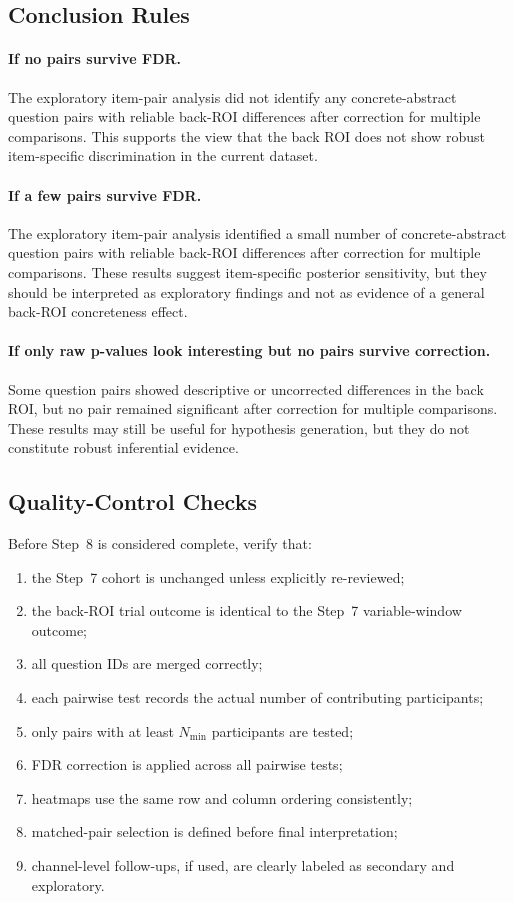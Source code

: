 \subsection{Conclusion Rules}

\paragraph{If no pairs survive FDR.}
The exploratory item-pair analysis did not identify any concrete-abstract question pairs with
reliable back-ROI differences after correction for multiple comparisons.
This supports the view that the back ROI does not show robust item-specific discrimination
in the current dataset.

\paragraph{If a few pairs survive FDR.}
The exploratory item-pair analysis identified a small number of concrete-abstract question pairs
with reliable back-ROI differences after correction for multiple comparisons.
These results suggest item-specific posterior sensitivity, but they should be interpreted as
exploratory findings and not as evidence of a general back-ROI concreteness effect.

\paragraph{If only raw p-values look interesting but no pairs survive correction.}
Some question pairs showed descriptive or uncorrected differences in the back ROI, but no pair
remained significant after correction for multiple comparisons.
These results may still be useful for hypothesis generation, but they do not constitute robust
inferential evidence.

\subsection{Quality-Control Checks}
Before Step~8 is considered complete, verify that:
\begin{enumerate}
    \item the Step~7 cohort is unchanged unless explicitly re-reviewed;
    \item the back-ROI trial outcome is identical to the Step~7 variable-window outcome;
    \item all question IDs are merged correctly;
    \item each pairwise test records the actual number of contributing participants;
    \item only pairs with at least \(N_{\min}\) participants are tested;
    \item FDR correction is applied across all pairwise tests;
    \item heatmaps use the same row and column ordering consistently;
    \item matched-pair selection is defined before final interpretation;
    \item channel-level follow-ups, if used, are clearly labeled as secondary and exploratory.
\end{enumerate}

